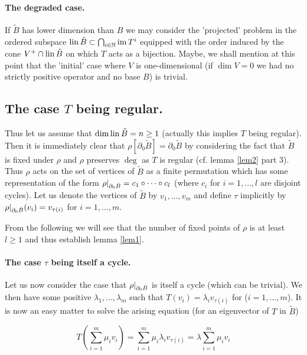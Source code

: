 \documentclass{article}
\begin{document}
\paragraph{The degraded case.} If $\tilde{B}$ has lower dimension than $B$ we may consider the 'projected' problem in the ordered subspace $\operatorname{lin}\tilde{B}\subset\bigcap_{i\in\mathbb{N}}\operatorname{im}{T^i}$ equipped with the order induced by the cone $V^+\cap\operatorname{lin}\tilde{B}$ on which $T$ acts as a bijection. 
Maybe, we shall mention at this point that the 'initial' case where $V$ is one-dimensional (if $\dim V=0$ we had no strictly positive operator and no base $B$) is trivial. 

\subsection{The case $T$ being regular.}
Thus let us assume that $\dim\operatorname{lin}\tilde{B}=n\geq 1$ (actually this implies $T$ being regular). 
Then it is immediately clear that $\rho[\partial_0{\tilde{B}}]=\partial_0{\tilde{B}}$ by considering the fact that $\tilde{B}$ is fixed under $\rho$ and $\rho$ preserves $\deg$ as $T$ is regular (cf. lemma \ref{lem2} part 3). 
Thus $\rho$ acts on the set of vertices of $\tilde{B}$ as a finite permutation which has some representation of the form $\rho\vert_{\partial_0{\tilde{B}}}=c_1\circ\cdots\circ c_l$ (where $c_i$ for $i=1,\ldots,l$ are disjoint cycles). 
Let us denote the vertices of $\tilde{B}$ by $v_1,\ldots,v_m$ and define $\tau$ implicitly by $\rho\vert_{\partial_0{\tilde{B}}}(v_i)=v_{\tau(i)}$ for $i=1,\ldots,m$. 

From the following we will see that the number of fixed points of $\rho$ is at least $l\geq 1$ and thus establish lemma \ref{lem1}.

\paragraph{The case $\tau$ being itself a cycle.}

Let us now consider the case that $\rho\vert_{\partial_0{\tilde{B}}}$ is itself a cycle (which can be trivial). 
We then have some positive $\lambda_1,\ldots,\lambda_m$ such that $T(v_i)=\lambda_iv_{\tau(i)}$ for ($i=1,\ldots,m$). 
It is now an easy matter to solve the arising equation (for an eigenvector of $T$ in $\tilde{B}$)

\begin{equation}
T\left(\sum_{i=1}^m\mu_iv_i\right)=\sum_{i=1}^m\mu_i\lambda_iv_{\tau(i)}=\lambda \sum_{i=1}^m\mu_iv_i
\end{equation}
\end{document}
